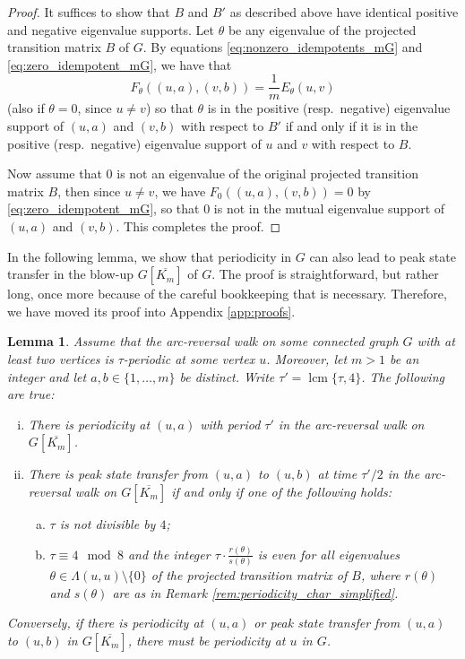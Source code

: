 \documentclass{article}
\newtheorem{lemma}[theorem]{Lemma}
\numberwithin{equation}{section}
\DeclareMathOperator{\lcm}{lcm}
\begin{document}
\begin{proof}
It suffices to show that $B$ and $B'$ as described above have identical positive and negative eigenvalue supports. Let $\theta$ be any eigenvalue of the projected transition matrix $B$ of $G$. By equations \eqref{eq:nonzero_idempotents_mG} and \eqref{eq:zero_idempotent_mG}, we have that
\[
F_\theta((u,a),(v,b)) = \frac{1}{m}E_\theta(u,v)
\]
(also if $\theta = 0$, since $u \neq v$)
so that $\theta$ is in the positive (resp.\ negative) eigenvalue support of $(u,a)$ and $(v,b)$ with respect to $B'$ if and only if it is in the positive (resp.\ negative) eigenvalue support of $u$ and $v$ with respect to $B$.

Now assume that $0$ is not an eigenvalue of the original projected transition matrix $B$, then since $u \neq v$, we have $F_0((u,a),(v,b)) = 0$ by \eqref{eq:zero_idempotent_mG}, so that $0$ is not in the mutual eigenvalue support of $(u,a)$ and $(v,b)$. This completes the proof.
\end{proof}

In the following lemma, we show that periodicity in $G$ can also lead to peak state transfer in the blow-up $G[\overline{K_m}]$ of $G$. The proof is straightforward, but rather long, once more because of the careful bookkeeping that is necessary. Therefore, we have moved its proof into Appendix \ref{app:proofs}.

\begin{lemma}
\label{lem:lex_product_periodicity}
Assume that the arc-reversal walk on some connected graph $G$ with at least two vertices is $\tau$-periodic at some vertex $u$. Moreover, let $m > 1$ be an integer and let $a,b \in \{1,\ldots,m\}$ be distinct. Write $\tau' = \lcm\{\tau,4\}$. The following are true:
\begin{enumerate}[(i)]
\item There is periodicity at $(u,a)$ with period $\tau'$ in the arc-reversal walk on $G[\overline{K_m}]$.
\item There is peak state transfer from $(u,a)$ to $(u,b)$ at time $\tau'/2$ in the arc-reversal walk on $G[\overline{K_m}]$ if and only if one of the following holds:
\begin{enumerate}[(a)]
\item $\tau$ is not divisible by $4$;
\item $\tau \equiv 4 \mod 8$ and the integer $\tau \cdot \frac{r(\theta)}{s(\theta)}$ is even for all eigenvalues $\theta \in \Lambda(u,u) \setminus \{0\}$ of the projected transition matrix of $B$, where $r(\theta)$ and $s(\theta)$ are as in Remark \ref{rem:periodicity_char_simplified}.
\end{enumerate}
\end{enumerate}
Conversely, if there is periodicity at $(u,a)$ or peak state transfer from $(u,a)$ to $(u,b)$ in $G[\overline{K_m}]$, there must be periodicity at $u$ in $G$.
\end{lemma}
\end{document}
